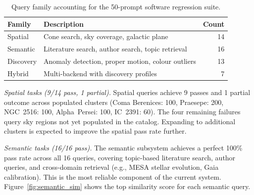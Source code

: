\documentclass[preprint,12pt,authoryear]{elsarticle}
\begin{document}
\begin{table}[htbp]
\centering
\caption{Query family accounting for the 50-prompt software regression suite.}
\label{tab:query_accounting}
\begin{tabular}{p{2.8cm}p{7.9cm}r}
\toprule
\textbf{Family} & \textbf{Description} & \textbf{Count} \\
\midrule
Spatial & Cone search, sky coverage, galactic plane & 14 \\
Semantic & Literature search, author search, topic retrieval & 16 \\
Discovery & Anomaly detection, proper motion, colour outliers & 13 \\
Hybrid & Multi-backend with discovery profiles & 7 \\
\bottomrule
\end{tabular}
\end{table}

\textit{Spatial tasks (9/14 pass, 1 partial).} Spatial queries achieve 9 passes and 1 partial outcome across populated clusters (Coma Berenices: 100, Praesepe: 200, NGC~2516: 100, Alpha~Persei: 100, IC~2391: 60). The four remaining failures query sky regions not yet populated in the catalog. Expanding to additional clusters is expected to improve the spatial pass rate further.

\textit{Semantic tasks (16/16 pass).} The semantic subsystem achieves a perfect 100\% pass rate across all 16 queries, covering topic-based literature search, author queries, and cross-domain retrieval (e.g., MESA stellar evolution, Gaia calibration). This is the most reliable component of the current system. Figure~\ref{fig:semantic_sim} shows the top similarity score for each semantic query.
\end{document}
